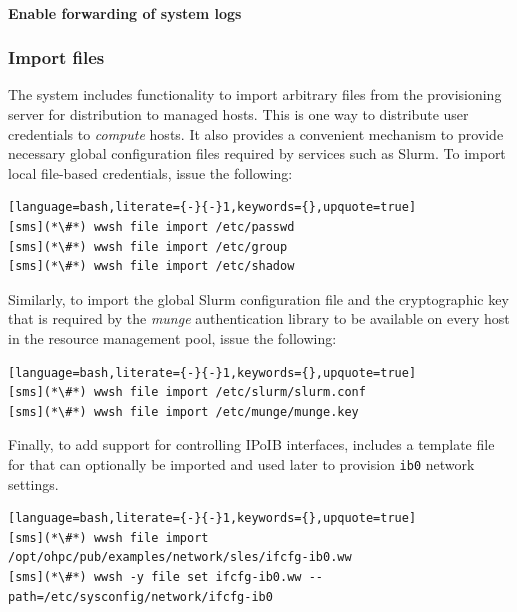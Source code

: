 \documentclass[letterpaper]{article}
\begin{document}


\paragraph{Enable forwarding of system logs} \label{sec:add_syslog}




\subsubsection{Import files} \label{sec:file_import}

The \Warewulf{} system includes functionality to import arbitrary files from
the provisioning server for distribution to managed hosts. This is one way to
distribute user credentials to {\em compute} hosts. It also provides a
convenient mechanism to provide necessary global configuration files required
by services such as Slurm. To import local file-based credentials, issue the
following:

\begin{lstlisting}[language=bash,literate={-}{-}1,keywords={},upquote=true]
[sms](*\#*) wwsh file import /etc/passwd
[sms](*\#*) wwsh file import /etc/group
[sms](*\#*) wwsh file import /etc/shadow 
\end{lstlisting}

Similarly, to import the global Slurm configuration file and the cryptographic
key that is required by the {\em munge} authentication library to be available
on every host in the resource management pool, issue the following:

\begin{lstlisting}[language=bash,literate={-}{-}1,keywords={},upquote=true]
[sms](*\#*) wwsh file import /etc/slurm/slurm.conf
[sms](*\#*) wwsh file import /etc/munge/munge.key
\end{lstlisting}

Finally, to add support for controlling IPoIB interfaces, \OHPC{} includes a
template file for \Warewulf{} that can optionally be imported and used later to provision
\texttt{ib0} network settings.

\begin{lstlisting}[language=bash,literate={-}{-}1,keywords={},upquote=true]
[sms](*\#*) wwsh file import /opt/ohpc/pub/examples/network/sles/ifcfg-ib0.ww
[sms](*\#*) wwsh -y file set ifcfg-ib0.ww --path=/etc/sysconfig/network/ifcfg-ib0
\end{lstlisting}
\end{document}
